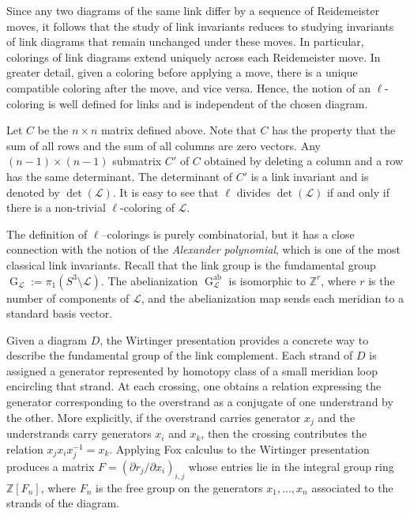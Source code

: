 \documentclass[table]{amsart}
\newcommand{\cL}{\mathcal{L}}
\newcommand{\op}[1]{\operatorname{#1}}
\numberwithin{equation}{section}
\begin{document}
\par Since any two diagrams of the same link differ by a sequence of Reidemeister moves, it follows that the study of link invariants reduces to studying invariants of link diagrams that remain unchanged under these moves. In particular, colorings of link diagrams extend uniquely across each Reidemeister move. In greater detail, given a coloring before applying a move, there is a unique compatible coloring after the move, and vice versa. Hence, the notion of an $\ell$-coloring is well defined for links and is independent of the chosen diagram. 
\par Let $C$ be the $n\times n$ matrix defined above. Note that $C$ has the property that the sum of all rows and the sum of all columns are zero vectors. Any $(n-1)\times (n-1)$ submatrix $C'$ of $C$ obtained by deleting a column and a row has the same determinant. The determinant of $C'$ is a link invariant and is denoted by $\op{det}(\cL)$. It is easy to see that $\ell$ divides $\op{det}(\cL)$ if and only if there is a non-trivial $\ell$-coloring of $\cL$. 

\par The definition of $\ell$–colorings is purely combinatorial, but it has a close connection with the notion of the \emph{Alexander polynomial}, which is one of the most classical link invariants. Recall that the link group is the fundamental group $\op{G}_{\cL}:=\pi_1(S^3\setminus \mathcal L)$. The abelianization $\op{G}_{\cL}^{\op{ab}}$ is isomorphic to $\mathbb Z^r$, where $r$ is the number of components of $\mathcal L$, and the abelianization map sends each meridian to a standard basis vector.
\par Given a diagram $D$, the Wirtinger presentation provides a concrete way to describe the fundamental group of the link complement. Each strand of $D$ is assigned a generator represented by homotopy class of a small meridian loop encircling that strand. At each crossing, one obtains a relation expressing the generator corresponding to the overstrand as a conjugate of one understrand by the other. More explicitly, if the overstrand carries generator $x_j$ and the understrands carry generators $x_i$ and $x_k$, then the crossing contributes the relation $x_jx_ix_j^{-1}=x_k$. Applying Fox calculus to the Wirtinger presentation produces a matrix $F=\left(\partial r_j/\partial x_i\right)_{i,j}$ whose entries lie in the integral group ring $\mathbb{Z}[F_n]$, where $F_n$ is the free group on the generators $x_1,\dots,x_n$ associated to the strands of the diagram.
\end{document}
